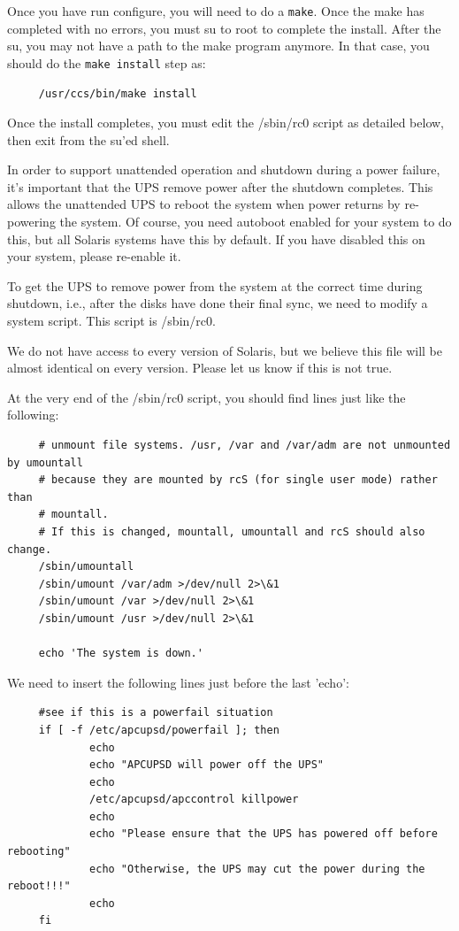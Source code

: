 Once you have run configure, you will need to do a {\tt make}.  Once the make
has completed with no errors, you must su to root to complete the install.
After the su, you may not have a path to the make program anymore. In that
case, you should do the {\tt make install} step as: 

\footnotesize
\begin{verbatim}
     /usr/ccs/bin/make install
\end{verbatim}
\normalsize

Once the install completes, you must edit the /sbin/rc0 script as detailed
below, then exit from the su'ed shell.  

In order to support unattended operation and shutdown during a power failure,
it's important that the UPS remove power after the shutdown completes. This
allows the unattended UPS to reboot the system when power returns by
re-powering the system. Of course, you need autoboot enabled for your system
to do this, but all Solaris systems have this by default. If you have disabled
this on your system, please re-enable it.  

To get the UPS to remove power from the system at the correct time during
shutdown, i.e., after the disks have done their final sync, we need to modify
a system script. This script is /sbin/rc0.  

We do not have access to every version of Solaris, but we believe this file
will be almost identical on every version. Please let us know if this is not
true.  

At the very end of the /sbin/rc0 script, you should find lines just like the
following: 

\footnotesize
\begin{verbatim}
     # unmount file systems. /usr, /var and /var/adm are not unmounted by umountall
     # because they are mounted by rcS (for single user mode) rather than
     # mountall.
     # If this is changed, mountall, umountall and rcS should also change.
     /sbin/umountall
     /sbin/umount /var/adm >/dev/null 2>\&1
     /sbin/umount /var >/dev/null 2>\&1
     /sbin/umount /usr >/dev/null 2>\&1
     
     echo 'The system is down.'
\end{verbatim}
\normalsize

We need to insert the following lines just before the last 'echo': 

\footnotesize
\begin{verbatim}
     #see if this is a powerfail situation
     if [ -f /etc/apcupsd/powerfail ]; then
             echo
             echo "APCUPSD will power off the UPS"
             echo
             /etc/apcupsd/apccontrol killpower
             echo
             echo "Please ensure that the UPS has powered off before rebooting"
             echo "Otherwise, the UPS may cut the power during the reboot!!!"
             echo
     fi
\end{verbatim}
\normalsize

